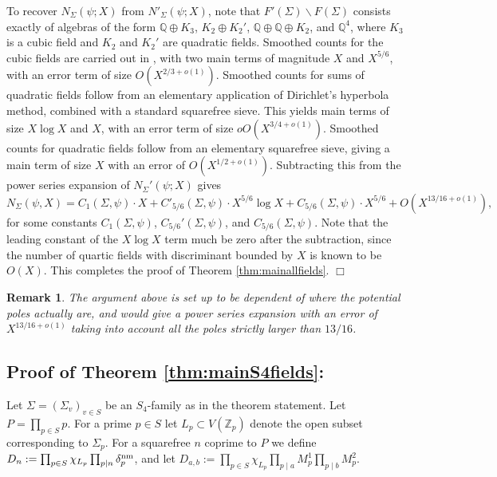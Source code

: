 \documentclass{article}
\def\Z{{\mathbb Z}}
\def\nm{{\rm nm}}
\def\Q{{\mathbb Q}}
\def\Z{{\mathbb Z}}
\def\Q{{\mathbb Q}}
\newtheorem{remark}[theorem]{Remark}
\begin{document}
To recover $N_\Sigma(\psi;X)$ from $N'_\Sigma(\psi;X)$, note that $F'(\Sigma)\backslash F(\Sigma)$ consists exactly of algebras of the form $\Q\oplus K_3$, $K_2\oplus K_2'$, $\Q\oplus\Q\oplus K_2$, and $\Q^4$, where $K_3$ is a cubic field and $K_2$ and $K_2'$ are quadratic fields. Smoothed counts for the cubic fields are carried out in \cite{SST2}, with two main terms of magnitude $X$ and $X^{5/6}$, with an error term of size $O(X^{2/3+o(1)})$. Smoothed counts for sums of quadratic fields follow from an elementary application of Dirichlet's hyperbola method, combined with a standard squarefree sieve. This yields main terms of size $X\log X$ and $X$, with an error term of size $oO(X^{3/4+o(1)})$. Smoothed counts for quadratic fields follow from an elementary squarefree sieve, giving a main term of size $X$ with an error of $O(X^{1/2+o(1)})$. Subtracting this from the power series expansion of $N_\Sigma'(\psi;X)$ gives
\begin{equation*}
N_{\Sigma}(\psi,X)=C_1(\Sigma,\psi)\cdot X+
C'_{5/6}(\Sigma,\psi)\cdot X^{5/6}\log X + C_{5/6}(\Sigma,\psi)\cdot X^{5/6} + O(X^{13/16+o(1)}),
\end{equation*}
for some constants $C_1(\Sigma,\psi)$, $C_{5/6}'(\Sigma,\psi)$, and $C_{5/6}(\Sigma,\psi)$. Note that the leading constant of the $X\log X$ term much be zero after the subtraction, since the number of quartic fields with discriminant bounded by $X$ is known to be $O(X)$. This completes the proof of Theorem \ref{thm:mainallfields}. $\Box$

\begin{remark}{\rm 
    The argument above is set up to be dependent of where the potential poles actually are, and would give a power series expansion with an error of  $X^{13/16+o(1)}$ taking into account all the poles strictly larger than $13/16$.
}\end{remark}



\subsection{Proof of Theorem \ref{thm:mainS4fields}:}

Let $\Sigma=(\Sigma_v)_{v\in S}$ be an $S_4$-family as in the theorem statement. Let $P=\prod_{p\in S} p$.  For a prime $p\in S$ let $L_p\subset V(\Z_p)$ denote the open subset corresponding to $\Sigma_p$. For a squarefree $n$ coprime to $P$ we define $D_n:=\prod_{p\in S} \chi_{L_p}\prod_{p\mid n} \delta_p^{\nm}$, and let
$D_{a,b}:=\prod_{p\in S} \chi_{L_p}\prod_{p\mid a} M_p^1\prod_{p\mid b} M_p^2$.
\end{document}
